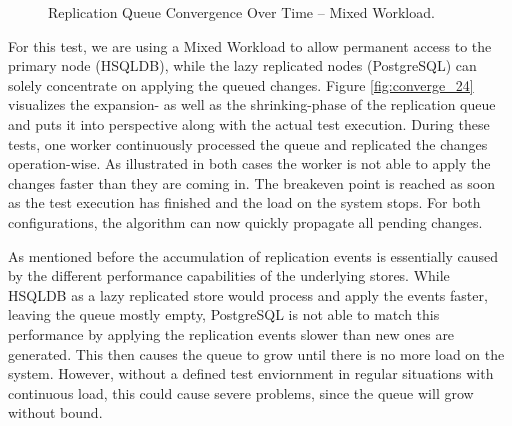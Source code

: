 


\begin{figure}[t] 
    \centering 
    \caption{Replication Queue Convergence Over Time -- Mixed Workload.}
    \label{fig:converge24}
\end{figure}



For this test, we are using a Mixed Workload to allow permanent access to the primary node (HSQLDB), while the lazy replicated nodes (PostgreSQL) can solely concentrate on applying the queued changes.
Figure \ref{fig:converge_24} visualizes the expansion- as well as the shrinking-phase of the replication queue
and puts it into perspective along with the actual test execution. During these tests, one worker continuously processed the queue and replicated 
the changes operation-wise. As illustrated in both cases the worker is not able to apply the changes faster than they are coming in.
The breakeven point is reached as soon as the test execution has finished and the load on the system stops. For both configurations, the algorithm can now quickly propagate all pending
changes.



As mentioned before the accumulation of replication events is essentially caused by the different performance capabilities of the underlying stores. 
While HSQLDB as a lazy replicated store would process and apply the events faster, 
leaving the queue mostly empty, PostgreSQL is not able to match this performance by applying the replication events slower than new ones
are generated. This then causes the queue to grow until there is no more load on the system.
However, without a defined test enviornment in regular situations with continuous load, this could cause severe problems,
since the queue will grow without bound.




